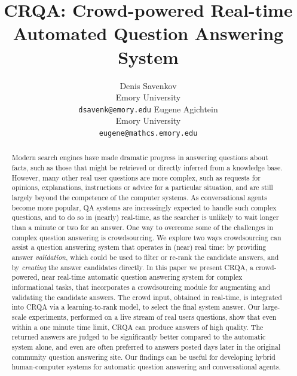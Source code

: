 \documentclass[letterpaper]{article}
\begin{document}
%
\title{CRQA: Crowd-powered Real-time Automated Question Answering System}
\author{
	Denis Savenkov\\
	Emory University\\
	\texttt{dsavenk@emory.edu}
\And
	Eugene Agichtein\\
	Emory University\\
	\texttt{eugene@mathcs.emory.edu}
}

\maketitle
\begin{abstract}
Modern search engines have made dramatic progress in answering questions about facts, such as those that might be retrieved or directly inferred from a knowledge base.
However, many other real user questions are more complex, such as requests for opinions, explanations, instructions or advice for a particular situation, and are still largely beyond the competence of the computer systems.
As conversational agents become more popular, QA systems are increasingly expected to handle such complex questions, and to do so in (nearly) real-time, as the searcher is unlikely to wait longer than a minute or two for an answer.
One way to overcome some of the challenges in complex question answering is crowdsourcing.
We explore two ways crowdsourcing can assist a question answering system that operates in (near) real time: by providing answer {\em validation}, which could be used to filter or re-rank the candidate answers, and by {\em creating} the answer candidates directly.
In this paper we present CRQA, a crowd-powered, near real-time automatic question answering system for complex informational tasks, that incorporates a crowdsourcing module for augmenting and validating the candidate answers.
The crowd input, obtained in real-time, is integrated into CRQA via a learning-to-rank model, to select the final system answer.
Our large-scale experiments, performed on a live stream of real users questions, show that even within a one minute time limit, CRQA can produce answers of high quality.
The returned answers are judged to be significantly better compared to the automatic system alone, and even are often preferred to answers posted days later in the original community question answering site.
Our findings can be useful for developing hybrid human-computer systems for automatic question answering and conversational agents.
\end{abstract}
\end{document}

